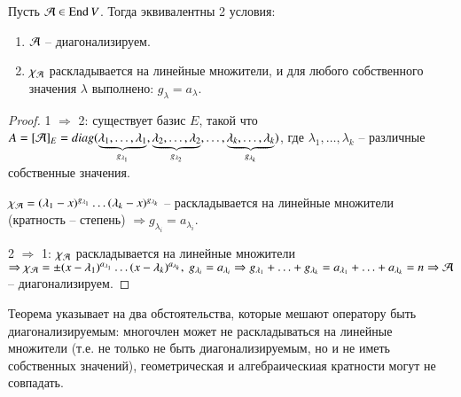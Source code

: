 \documentclass[main]{subfiles}
\begin{document}
\begin{theorem}
    Пусть $\mathcal{A} \in \operatorname{End} V$. Тогда эквивалентны 2 условия:
    \begin{enumerate}
        \item $\mathcal{A}$ -- диагонализируем.
        \item $\chi_{\mathcal{A}}$ раскладывается на линейные множители, и для любого собственного значения $\lambda$ выполнено: $g_{\lambda} = a_{\lambda}$.
    \end{enumerate}
\end{theorem}



\begin{proof}
    1 $\Rightarrow$ 2: существует базис $E$, такой что $A = [\mathcal{A}]_E = diag(\underbrace{\lambda_1, \ldots, \lambda_1}_{g_{\lambda_1}},
        \underbrace{\lambda_2, \ldots, \lambda_2}_{g_{\lambda_2}}, \ldots, \underbrace{\lambda_k, \ldots, \lambda_k}_{g_{\lambda_k}})$, где $\lambda_1, \ldots, \lambda_k$ -- различные собственные значения.

    $\chi_{\mathcal{A}} = (\lambda_1 - x)^{g_{\lambda_1}}\ldots (\lambda_k - x)^{g_{\lambda_k}}$ -- раскладывается на линейные множители (кратность -- степень)
    $\Rightarrow g_{\lambda_i} = a_{\lambda_i}$.

    2 $\Rightarrow$ 1: $\chi_{\mathcal{A}}$ раскладывается на линейные множители $\Rightarrow \chi_{\mca} = \pm(x-\lambda_1)^{a_{\lambda_1}}\ldots(x-\lambda_k)^{a_{\lambda_k}},\ g_{\lambda_i} = a_{\lambda_i}
        \Rightarrow g_{\lambda_1}+\ldots+g_{\lambda_k} = a_{\lambda_1}+\ldots+a_{\lambda_k} = n \Rightarrow \mca$ -- диагонализируем.
\end{proof}

Теорема указывает на два обстоятельства, которые мешают оператору быть диагонализируемым: многочлен может не раскладываться на линейные множители (т.е. не только не быть диагонализируемым, но и не иметь собственных значений), геометрическая и алгебраическиая кратности могут не совпадать.
\end{document}
